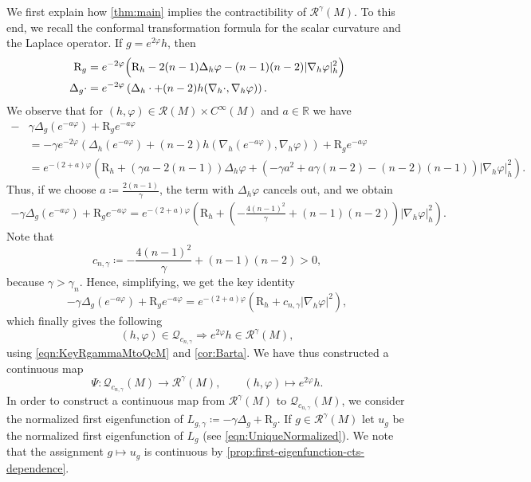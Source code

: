 \documentclass[11pt]{amsart}
\numberwithin{equation}{section}
\newcommand{\R}{\mathbb R}
\newcommand{\Riem}{\mathcal{R}}
\newcommand{\calQ}{\mathcal{Q}}
\newcommand{\scal}{\mathrm{R}}
\newcommand{\Q}{\mathcal Q}
\begin{document}
We first explain how \cref{thm:main} implies the contractibility of $\Riem^\gamma(M)$.
To this end, we recall the conformal transformation formula for the scalar curvature and the Laplace operator.
If $g=e^{2\varphi}h$, then
\begin{align}\label{eq:conformal-scalar}
\scal_{g}={}&e^{-2\varphi}\Bigl(\scal_h-2(n-1)\Delta_h \varphi-(n-1)(n-2)|\nabla_h\varphi|_h^2\Bigr)\\
\Delta_g\cdot ={}&e^{-2\varphi}\left(\Delta_h\cdot+(n-2)h(\nabla_h\cdot,\nabla_h\varphi)\right).
\end{align}
We observe that for $(h,\varphi)\in\Riem(M)\times C^\infty(M)$ and $a\in\R$ we have 
\begin{align*}
-&\gamma\Delta_g(e^{-a\varphi})+\scal_g e^{-a\varphi} \\
&=-\gamma e^{-2\varphi}\left(\Delta_h(e^{-a\varphi})+(n-2)h(\nabla_h (e^{-a\varphi}),\nabla_h\varphi)\right)+\scal_ge^{-a\varphi} \\
&=e^{-(2+a)\varphi}\left(\scal_h+(\gamma a-2(n-1))\Delta_h\varphi+(-\gamma a^2+a\gamma(n-2)-(n-2)(n-1))|\nabla_h\varphi|_h^2\right).
\end{align*}
Thus, if we choose $a\coloneqq\frac{2(n-1)}{\gamma}$, the term with $\Delta_h\varphi$ cancels out, and we obtain
\begin{align*}
-\gamma\Delta_g(e^{-a\varphi})+\scal_ge^{-a\varphi} = e^{-(2+a)\varphi}\left(\scal_h+\left(-\frac{4(n-1)^2}{\gamma}+(n-1)(n-2)\right)|\nabla_h\varphi|_h^2\right).
\end{align*}
Note that 
\begin{equation}\label{eqn:cngamma}
c_{n,\gamma}\coloneqq-\frac{4(n-1)^2}{\gamma}+(n-1)(n-2)>0,
\end{equation}
because $\gamma>\gamma_n$.
Hence, simplifying, we get the key identity
\begin{equation}\label{eqn:KeyRgammaMtoQcM}
-\gamma\Delta_g(e^{-a\varphi})+\scal_g e^{-a\varphi} = e^{-(2+a)\varphi}\left(\scal_h + c_{n,\gamma}|\nabla_h\varphi|^2\right),
\end{equation}
which finally gives the following
\[
(h,\varphi)\in \calQ_{c_{n,\gamma}} \Rightarrow e^{2\varphi}h\in\Riem^\gamma(M),
\]
 using \eqref{eqn:KeyRgammaMtoQcM} and \cref{cor:Barta}. 
We have thus constructed a continuous map 
\[
\Psi\colon\Q_{c_{n,\gamma}}(M)\to\Riem^\gamma(M),\qquad (h,\varphi)\mapsto e^{2\varphi}h.
\]
In order to construct a continuous map from  $\Riem^\gamma(M)$ to $\Q_{c_{n,\gamma}}(M)$, we consider the normalized first eigenfunction of $L_{g,\gamma}\coloneqq-\gamma\Delta_g+\scal_g$.
If $g\in \Riem^\gamma(M)$ let $u_g$ be the normalized first eigenfunction of $L_g$ (see \eqref{eqn:UniqueNormalized}).
We note that the assignment $g\mapsto u_g$ is continuous by \cref{prop:first-eigenfunction-cts-dependence}.
\end{document}
